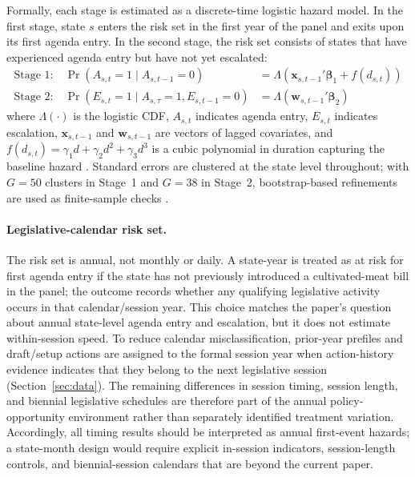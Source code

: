 \documentclass[12pt]{article}
\begin{document}
Formally, each stage is estimated as a discrete-time logistic hazard model.  In the first stage, state $s$ enters the risk set in the first year of the panel and exits upon its first agenda entry.  In the second stage, the risk set consists of states that have experienced agenda entry but have not yet escalated:
\begin{align}
    \text{Stage 1:} \quad \Pr(A_{s,t} = 1 \mid A_{s,t-1} = 0) &= \Lambda\!\left(\mathbf{x}_{s,t-1}'\boldsymbol{\beta}_1 + f(d_{s,t})\right) \label{eq:stage1} \\[6pt]
    \text{Stage 2:} \quad \Pr(E_{s,t} = 1 \mid A_{s,\tau} = 1, E_{s,t-1} = 0) &= \Lambda\!\left(\mathbf{w}_{s,t-1}'\boldsymbol{\beta}_2\right) \label{eq:stage2}
\end{align}
where $\Lambda(\cdot)$ is the logistic CDF, $A_{s,t}$ indicates agenda entry, $E_{s,t}$ indicates escalation, $\mathbf{x}_{s,t-1}$ and $\mathbf{w}_{s,t-1}$ are vectors of lagged covariates, and $f(d_{s,t}) = \gamma_1 d + \gamma_2 d^2 + \gamma_3 d^3$ is a cubic polynomial in duration capturing the baseline hazard \citep{carter2010temporal,box2001duration}.  Standard errors are clustered at the state level throughout; with $G=50$ clusters in Stage~1 and $G=38$ in Stage~2, bootstrap-based refinements are used as finite-sample checks \citep{cameron2008bootstrap,mackinnon2018wild}.

\paragraph{Legislative-calendar risk set.}  The risk set is annual, not monthly or daily.  A state-year is treated as at risk for first agenda entry if the state has not previously introduced a cultivated-meat bill in the panel; the outcome records whether any qualifying legislative activity occurs in that calendar/session year.  This choice matches the paper's question about annual state-level agenda entry and escalation, but it does not estimate within-session speed.  To reduce calendar misclassification, prior-year prefiles and draft/setup actions are assigned to the formal session year when action-history evidence indicates that they belong to the next legislative session (Section~\ref{sec:data}).  The remaining differences in session timing, session length, and biennial legislative schedules are therefore part of the annual policy-opportunity environment rather than separately identified treatment variation.  Accordingly, all timing results should be interpreted as annual first-event hazards; a state-month design would require explicit in-session indicators, session-length controls, and biennial-session calendars that are beyond the current paper.
\end{document}
